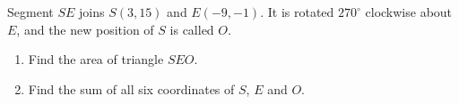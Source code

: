 Segment $SE$ joins $S(3,15)$ and $E(-9,-1)$. It is rotated $270^\circ$ clockwise about $E$, and the new position of $S$ is called $O$.
\begin{enumerate}
\item[(a)] Find the area of triangle $SEO$.
\item[(b)] Find the sum of all six coordinates of $S$, $E$ and $O$.
\end{enumerate}
